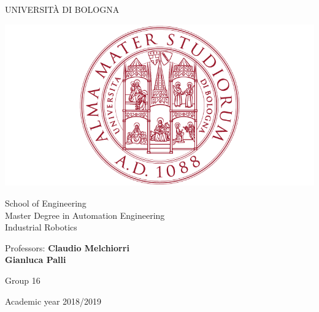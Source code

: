 \documentclass[a4paper,11pt,oneside]{book}
\begin{document}
\pagestyle{myheadings}

\thispagestyle{empty}                                                 
\begin{center}                                                            
    \vspace{5mm}
    {\LARGE UNIVERSIT\`A DI BOLOGNA} \\                       
      \vspace{5mm}
\end{center}
\begin{center}
  \includegraphics[scale=.27]{figs/logo_unibo}
\end{center}
\begin{center}
      \vspace{5mm}
      {\LARGE School of Engineering} \\
        \vspace{3mm}
      {\Large Master Degree in Automation Engineering} \\
      \vspace{20mm}
      {\LARGE Industrial Robotics} \\
      \vspace{15mm}
\end{center}
\begin{flushleft}                                                                              
     {\large Professors: \textbf{\@ Claudio Melchiorri}\\  \hspace{20mm} \textbf{\@ Gianluca Palli}} \\  
     
      \vspace{13mm}
\end{flushleft}
\begin{flushright}
      {\large Group 16}\\
\end{flushright}        %
\begin{center}
\vfill
      {\large Academic year \@2018/2019} \\
\end{center}
\end{document}

